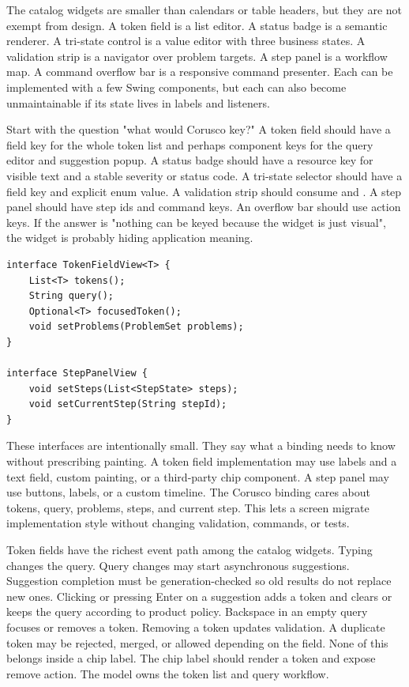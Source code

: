 The catalog widgets are smaller than calendars or table headers, but they are not exempt
from design. A token field is a list editor. A status badge is a semantic renderer. A
tri-state control is a value editor with three business states. A validation strip is a
navigator over problem targets. A step panel is a workflow map. A command overflow bar
is a responsive command presenter. Each can be implemented with a few Swing components,
but each can also become unmaintainable if its state lives in labels and listeners.

Start with the question "what would Corusco key?" A token field should have a field key
for the whole token list and perhaps component keys for the query editor and suggestion
popup. A status badge should have a resource key for visible text and a stable severity
or status code. A tri-state selector should have a field key and explicit enum value. A
validation strip should consume  and
. A step panel
should have step ids and command keys. An overflow bar should use action keys. If the
answer is "nothing can be keyed because the widget is just visual", the widget is
probably hiding application meaning.

\begin{lstlisting}[caption={Catalog widgets should expose semantic state, not only children.}]
interface TokenFieldView<T> {
    List<T> tokens();
    String query();
    Optional<T> focusedToken();
    void setProblems(ProblemSet problems);
}

interface StepPanelView {
    void setSteps(List<StepState> steps);
    void setCurrentStep(String stepId);
}
\end{lstlisting}

These interfaces are intentionally small. They say what a binding needs to know without
prescribing painting. A token field implementation may use labels and a text field,
custom painting, or a third-party chip component. A step panel may use buttons, labels,
or a custom timeline. The Corusco binding cares about tokens, query, problems, steps,
and current step. This lets a screen migrate implementation style without changing
validation, commands, or tests.

Token fields have the richest event path among the catalog widgets. Typing changes the
query. Query changes may start asynchronous suggestions. Suggestion completion must be
generation-checked so old results do not replace new ones. Clicking or pressing Enter on
a suggestion adds a token and clears or keeps the query according to product policy.
Backspace in an empty query focuses or removes a token. Removing a token updates
validation. A duplicate token may be rejected, merged, or allowed depending on the
field. None of this belongs inside a chip label. The chip label should render a token
and expose remove action. The model owns the token list and query workflow.


